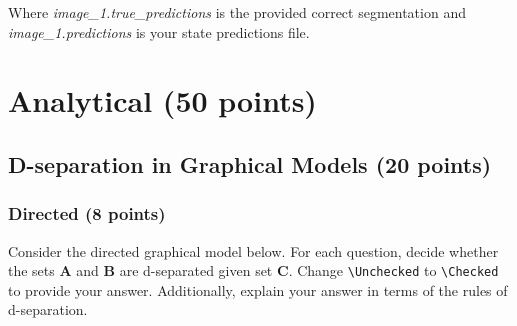 \documentclass[11pt]{article}
\newcommand{\Checked}{{\LARGE \XBox}}%
\newcommand{\Unchecked}{{\LARGE \Square}}%
\begin{document}
Where \textit{image\_1.true\_predictions} is the provided correct segmentation and \textit{image\_1.predictions} is your state predictions file.

\newpage
\section{Analytical (50 points)}


\subsection{D-separation in Graphical Models (20 points)}

\subsubsection{Directed (8 points)}
Consider the directed graphical model below. For each question, decide whether the sets
\textbf{A} and \textbf{B} are d-separated given set \textbf{C}.  Change \verb|\Unchecked| to \verb|\Checked| to provide your answer.
Additionally, explain your answer in terms of the rules of d-separation. 
\end{document}
